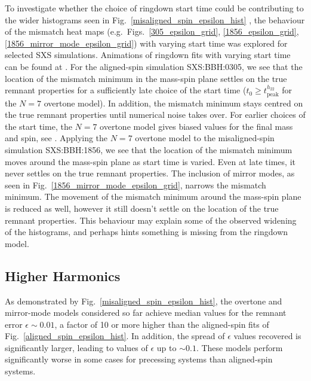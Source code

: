 To investigate whether the choice of ringdown start time could be contributing to the wider histograms seen in Fig.~\ref{misaligned_spin_epsilon_hist} %
, the behaviour of the mismatch heat maps (e.g.\ Figs.~\ref{305_epsilon_grid}, \ref{1856_epsilon_grid}, \ref{1856_mirror_mode_epsilon_grid}) with varying start time was explored for selected SXS simulations. 
Animations of ringdown fits with varying start time can be found at \cite{finch_eliot_2021_4538194}.
For the aligned-spin simulation SXS:BBH:0305, we see that the location of the mismatch minimum in the mass-spin plane settles on the true remnant properties for a sufficiently late choice of the start time ($t_0 \geq t_{\mathrm{peak}}^{h_{22}}$ for the $N=7$ overtone model). 
In addition, the mismatch minimum stays centred on the true remnant properties until numerical noise takes over.
For earlier choices of the start time, the $N=7$ overtone model gives biased values for the final mass and spin, see \cite{finch_eliot_2021_4538194}.
Applying the $N=7$ overtone model to the misaligned-spin simulation SXS:BBH:1856, we see that the location of the mismatch minimum moves around the mass-spin plane as start time is varied. Even at late times, it never settles on the true remnant properties.
The inclusion of mirror modes, as seen in Fig.~\ref{1856_mirror_mode_epsilon_grid}, narrows the mismatch minimum. The movement of the mismatch minimum around the mass-spin plane is reduced as well, however it still doesn't settle on the location of the true remnant properties.
This behaviour may explain some of the observed widening of the histograms, and perhaps hints something is missing from the ringdown model.


\subsection{Higher Harmonics}\label{kitchen-sink}

As demonstrated by Fig.~\ref{misaligned_spin_epsilon_hist}, %
the overtone and mirror-mode models considered so far achieve median values for the remnant error $\epsilon \sim 0.01$, a factor of 10 or more higher than the aligned-spin fits of Fig.~\ref{aligned_spin_epsilon_hist}. In addition, the spread of $\epsilon$ values recovered is significantly larger, leading to values of $\epsilon$ up to $\sim 0.1$. 
These models perform significantly worse in some cases for precessing systems than aligned-spin systems.

